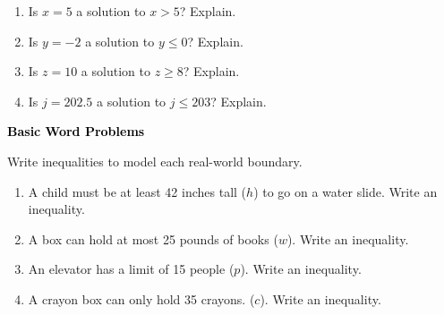 \documentclass[12pt, letterpaper, fleqn]{article}
\begin{document}
\begin{enumerate}[itemsep=2.2cm, leftmargin=0.6cm]

\item Is $x = 5$ a solution to $x > 5$? Explain.

\vspace{2cm}

\item Is $y = -2$ a solution to $y \le 0$? Explain.

\vspace{2cm}

\item Is $z = 10$ a solution to $z \ge 8$? Explain.

\vspace{2cm}

\item Is $j = 202.5$ a solution to $j \le 203$? Explain.

\vspace{2cm}

\end{enumerate}

\newpage

\begin{tcolorbox}[colback=black!10]
\large\textcolor{black}{\textbf{Basic Word Problems}}
\end{tcolorbox}

\noindent
Write inequalities to model each real-world boundary.

\vspace{3mm}

\begin{enumerate}[itemsep=2.2cm, leftmargin=0.6cm]

\item A child must be at least 42 inches tall ($h$) to go on a water slide. Write an inequality.

\vspace{2.2cm}

\item A box can hold at most 25 pounds of books ($w$). Write an inequality.

\vspace{2.2cm}

\item An elevator has a limit of 15 people ($p$). Write an inequality.

\vspace{2.2cm}

\item A crayon box can only hold 35 crayons. ($c$). Write an inequality.

\vspace{2.2cm}

\end{enumerate}
\end{document}
